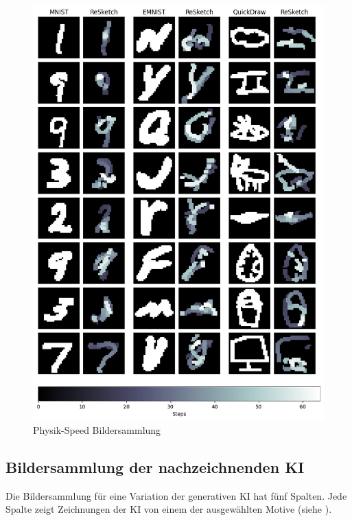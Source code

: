\begin{figure}[!ht]
    \centering
    \includegraphics[width=\textwidth]{images/resultate/physics-speed.png}
    \caption{Physik-Speed Bildersammlung}
    \label{fig:Physik-Speed}
\end{figure}


\subsection{Bildersammlung der nachzeichnenden KI}\label{sub:r_bild_nach}

Die Bildersammlung für eine Variation der generativen KI hat fünf Spalten. Jede
Spalte zeigt Zeichnungen der KI von einem der ausgewählten Motive (siehe
).
